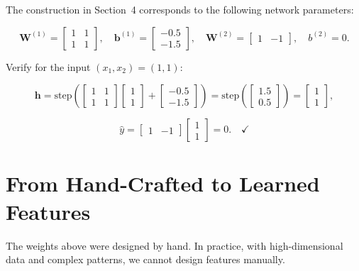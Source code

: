 \documentclass[12pt, a4paper]{article}
\newif\ifstudentmode
\newcommand{\sol}[2][6cm]{%
  \ifstudentmode
    \underline{\hspace{#1}}%
  \else
    {#2}%
  \fi
}
\theoremstyle{definition}
\newcommand{\bW}{\mathbf{W}}
\newcommand{\bb}{\mathbf{b}}
\newcommand{\bh}{\mathbf{h}}
\newcommand{\yhat}{\hat{y}}
\begin{document}
The construction in Section~4 corresponds to the following network parameters:

\[
  \bW^{(1)} =
  \begin{bmatrix} 1 & 1 \\ 1 & 1 \end{bmatrix},
  \quad
  \bb^{(1)} =
  \begin{bmatrix} -0.5 \\ -1.5 \end{bmatrix},
  \quad
  \bW^{(2)} =
  \begin{bmatrix} 1 & -1 \end{bmatrix},
  \quad
  b^{(2)} = 0.
\]

Verify for the input $(x_1, x_2) = (1, 1)$:

\[
  \bh
  = \text{step}\!\left(
      \begin{bmatrix}1&1\\1&1\end{bmatrix}
      \begin{bmatrix}1\\1\end{bmatrix}
      +
      \begin{bmatrix}-0.5\\-1.5\end{bmatrix}
    \right)
  = \text{step}\!\left(\begin{bmatrix}1.5\\0.5\end{bmatrix}\right)
  = \sol[3cm]{\begin{bmatrix}1\\1\end{bmatrix}},
\]

\[
  \yhat
  = \begin{bmatrix}1 & -1\end{bmatrix}
    \begin{bmatrix}1\\1\end{bmatrix}
  = \sol[3cm]{0}. \quad\checkmark
\]

\section{From Hand-Crafted to Learned Features}

The weights above were designed by hand.  In practice, with high-dimensional
data and complex patterns, we cannot design features manually.
\end{document}
